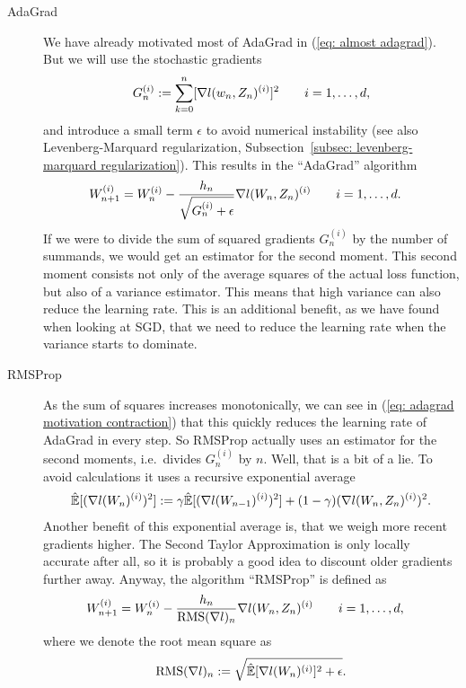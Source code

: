 \begin{description}
	\item[AdaGrad] \parencite{duchiAdaptiveSubgradientMethods2011}
	We have already motivated most of AdaGrad in (\ref{eq: almost adagrad}).
	But we will use the stochastic gradients
	\begin{align*}
		G_n^{(i)} := \sum_{k=0}^n [\nabla l(w_n, Z_n)^{(i)}]^2 \qquad i=1,\dots,d,
	\end{align*}
	and introduce a small term \(\epsilon\) \parencite[\(\approx 10^{-8}\)][]{ruderOverviewGradientDescent2017}
	to avoid numerical instability (see also Levenberg-Marquard regularization,
	Subsection~\ref{subsec: levenberg-marquard regularization}). This results in
	the ``AdaGrad'' algorithm
 	\begin{align*}
		W_{n+1}^{(i)}
		&= W_n^{(i)}
		- \frac{h_n}{\sqrt{G_n^{(i)}+\epsilon}}\nabla l(W_n, Z_n)^{(i)}
		\qquad i=1,\dots,d.
	\end{align*}
	If we were to divide the sum of squared gradients \(G_n^{(i)}\) by the number
	of summands, we would get an estimator for the second moment. This second
	moment consists not only of the average squares of the actual loss function,
	but also of a variance estimator. This means that high variance can also
	reduce the learning rate. This is an additional benefit, as we have found
	when looking at SGD, that we need to reduce the learning rate when the
	variance starts to dominate.

	\item[RMSProp]\parencite[lecture 6e]{hintonNeuralNetworksMachine2012} As the sum of squares increases monotonically, we can see 
	in (\ref{eq: adagrad motivation contraction}) that this quickly reduces
	the learning rate of AdaGrad in every step. So RMSProp actually uses an
	estimator for the second moments, i.e.\ divides \(G_n^{(i)}\) by \(n\). Well,
	that is a bit of a lie. To avoid calculations it uses a recursive exponential
	average
	\begin{align*}
		\hat{\mathbb{E}}[(\nabla l(W_n)^{(i)})^2]
		:= \gamma \hat{\mathbb{E}}[(\nabla l(W_{n-1})^{(i)})^2]
		+ (1-\gamma)(\nabla l(W_n, Z_n)^{(i)})^2.
	\end{align*}
	Another benefit of this exponential average is, that we weigh more recent
	gradients higher. The Second Taylor Approximation is only locally
	accurate after all, so it is probably a good idea to discount older gradients
	further away. Anyway, the algorithm ``RMSProp'' is defined as
	\begin{align*}
		W_{n+1}^{(i)}
		&= W_n^{(i)}
		- \frac{h_n}{\text{RMS}(\nabla l)_n}\nabla l(W_n, Z_n)^{(i)}
		\qquad i=1,\dots,d,
	\end{align*}
	where we denote the root mean square as
	\begin{align*}
		\text{RMS}(\nabla l)_n := \sqrt{\hat{\mathbb{E}}[\nabla l(W_n)^{(i)}]^2+\epsilon}.
	\end{align*}


\end{description}
